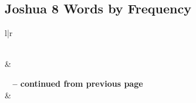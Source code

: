 

\subsection{Joshua 8 Words by Frequency}


\normalsize
 
\begin{center}
\begin{longtable}{l|r}
\caption[Joshua 8 Words by Frequency]{Joshua 8 Words by Frequency}\label{table:WordsbyFrequency for Joshua 8} \\
\hline {} &  \\ \hline 
\endfirsthead
 
{{\bfseries \tablename\ \thetable{} -- continued from previous page}} \\  
\hline {} &  \\ \hline 
\endhead
 

\end{longtable}
\end{center}
